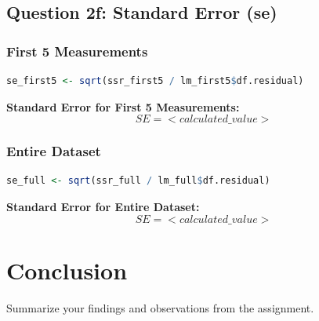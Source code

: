 \documentclass{article}
\begin{document}
\subsection{Question 2f: Standard Error (se)}
\subsubsection{First 5 Measurements}
\begin{lstlisting}[language=R]
se_first5 <- sqrt(ssr_first5 / lm_first5$df.residual)
\end{lstlisting}
\textbf{Standard Error for First 5 Measurements:} \[ SE = <calculated\_value> \]

\subsubsection{Entire Dataset}
\begin{lstlisting}[language=R]
se_full <- sqrt(ssr_full / lm_full$df.residual)
\end{lstlisting}
\textbf{Standard Error for Entire Dataset:} \[ SE = <calculated\_value> \]

\section{Conclusion}
Summarize your findings and observations from the assignment.
\end{document}
